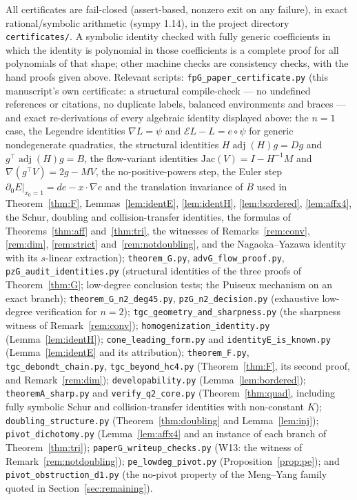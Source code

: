 \documentclass[11pt]{article}
\theoremstyle{plain}
\theoremstyle{definition}
\newcommand{\adj}{\operatorname{adj}}
\newcommand{\Eu}{\mathcal{E}}
\begin{document}
All certificates are fail-closed (assert-based, nonzero exit on any
failure), in exact rational/symbolic arithmetic (sympy 1.14), in the
project directory \texttt{certificates/}. A symbolic identity checked
with fully generic coefficients in which the identity is polynomial in
those coefficients is a complete proof for all polynomials of that
shape; other machine checks are consistency checks, with the hand proofs
given above. Relevant scripts:
\texttt{fpG\_paper\_certificate.py} (this manuscript's own certificate: a
structural compile-check --- no undefined references or citations, no
duplicate labels, balanced environments and braces --- and exact
re-derivations of every algebraic identity displayed above: the
$n=1$ case, the Legendre identities $\nabla L=\psi$ and
$\Eu L-L=e\circ\psi$ for generic nondegenerate quadratics, the
structural identities $H\adj(H)g=Dg$ and $g^{\top}\adj(H)g=B$, the
flow-variant identities $\mathrm{Jac}(V)=I-H^{-1}M$ and
$\nabla(g^{\top}V)=2g-MV$, the no-positive-powers step, the Euler step
$\partial_0E|_{x_0=1}=de-x\cdot\nabla e$ and the translation invariance
of $B$ used in Theorem~\ref{thm:F}, Lemmas~\ref{lem:identE},
\ref{lem:identH}, \ref{lem:bordered}, \ref{lem:affx4}, the Schur,
doubling and collision-transfer identities, the formulas of
Theorems~\ref{thm:aff} and~\ref{thm:tri}, the witnesses of
Remarks~\ref{rem:conv}, \ref{rem:dim}, \ref{rem:strict}
and~\ref{rem:notdoubling}, and the Nagaoka--Yazawa identity with its
$s$-linear extraction); \texttt{theorem\_G.py},
\texttt{advG\_flow\_proof.py}, \texttt{pzG\_audit\_identities.py}
(structural identities of the three proofs of Theorem~\ref{thm:G};
low-degree conclusion tests; the Puiseux mechanism on an exact branch);
\texttt{theorem\_G\_n2\_deg45.py}, \texttt{pzG\_n2\_decision.py}
(exhaustive low-degree verification for $n=2$);
\texttt{tgc\_geometry\_and\_sharpness.py} (the sharpness witness of
Remark~\ref{rem:conv}); \texttt{homogenization\_identity.py}
(Lemma~\ref{lem:identH}); \texttt{cone\_leading\_form.py} and
\texttt{identityE\_is\_known.py} (Lemma~\ref{lem:identE} and its
attribution); \texttt{theorem\_F.py}, \texttt{tgc\_debondt\_chain.py},
\texttt{tgc\_beyond\_hc4.py} (Theorem~\ref{thm:F}, its second proof, and
Remark~\ref{rem:dim}); \texttt{developability.py}
(Lemma~\ref{lem:bordered}); \texttt{theoremA\_sharp.py} and
\texttt{verify\_q2\_core.py} (Theorem~\ref{thm:quad}, including fully
symbolic Schur and collision-transfer identities with non-constant $K$);
\texttt{doubling\_structure.py} (Theorem~\ref{thm:doubling} and
Lemma~\ref{lem:inj}); \texttt{pivot\_dichotomy.py}
(Lemma~\ref{lem:affx4} and an instance of each branch of
Theorem~\ref{thm:tri}); \texttt{paperG\_writeup\_checks.py} (W13: the
witness of Remark~\ref{rem:notdoubling}); \texttt{pe\_lowdeg\_pivot.py}
(Proposition~\ref{prop:pe}); and \texttt{pivot\_obstruction\_d1.py} (the
no-pivot property of the Meng--Yang family quoted in
Section~\ref{sec:remaining}).
\end{document}
